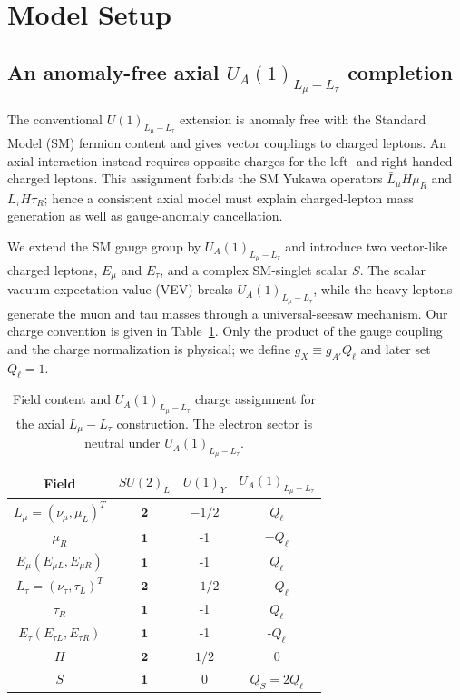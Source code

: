 \documentclass[onecolumn, aps, nofootinbib, prd, preprint, floats, floatfix, amsmath, amssymb, superscriptaddress, preprintnumbers]{revtex4-2}
\begin{document}
\section{Model Setup}
\label{sec:model-setup}

\subsection{An anomaly-free axial $U_A(1)_{L_\mu-L_\tau}$ completion}

The conventional $U(1)_{L_\mu-L_\tau}$ extension is anomaly free with the
Standard Model (SM) fermion content and gives vector couplings to charged
leptons.  An axial interaction instead requires opposite charges for the
left- and right-handed charged leptons.  This assignment forbids the SM
Yukawa operators $\bar L_\mu H\mu_R$ and $\bar L_\tau H\tau_R$; hence a
consistent axial model must explain charged-lepton mass generation as well as
gauge-anomaly cancellation.

We extend the SM gauge group by $
U_A(1)_{L_\mu-L_\tau}$ and introduce two vector-like charged leptons,
$E_\mu$ and $E_\tau$, and a complex SM-singlet scalar $S$.  The scalar vacuum
expectation value (VEV) breaks $U_A(1)_{L_\mu-L_\tau}$, while the heavy leptons generate the
muon and tau masses through a universal-seesaw mechanism.  Our charge
convention is given in Table~\ref{tab:charge-assignment}.  Only the product of
the gauge coupling and the charge normalization is physical; we define
$g_X\equiv g_{A'}Q_\ell$ and later set $Q_\ell=1$.

\begin{table}[htbp]
    \centering
    \begin{tabular}{cccc}
    \hline
    Field & $SU(2)_L$ & $U(1)_Y$ & $U_A(1)_{L_\mu-L_\tau}$ \\
    \hline
    $L_{\mu}=\left(\nu_{\mu}, \mu_L\right)^T$ & $\mathbf{2}$ & $-1 / 2$ & $Q_{\ell}$ \\
    \hline
    $\mu_R$ & $\mathbf{1}$ & -1 & $-Q_\ell$ \\
    \hline
    $E_\mu\left(E_{\mu L}, E_{\mu R}\right)$ & $\mathbf{1}$ & -1 & $Q_\ell$\\
    \hline
    $L_{\tau}=\left(\nu_{\tau}, \tau_L\right)^T$ & $\mathbf{2}$ & $-1 / 2$ & $-Q_\ell$ \\
    \hline
    $\tau_R$ & $\mathbf{1}$ & -1 & $Q_\ell$ \\
    \hline
    $E_\tau\left(E_{\tau L}, E_{\tau R}\right)$ & $\mathbf{1}$ & -1 & -$Q_\ell$\\
    \hline
    $H$ & $\mathbf{2}$ & $1 / 2$ & 0 \\
    $S$ & $\mathbf{1}$ & 0 & $Q_S=2Q_\ell$\\
    \hline
    \end{tabular}
    \caption{Field content and $U_A(1)_{L_\mu-L_\tau}$ charge assignment for the axial $L_\mu-L_\tau$ construction. The electron sector is neutral under $U_A(1)_{L_\mu-L_\tau}$.}
    \label{tab:charge-assignment}
\end{table}
\end{document}
